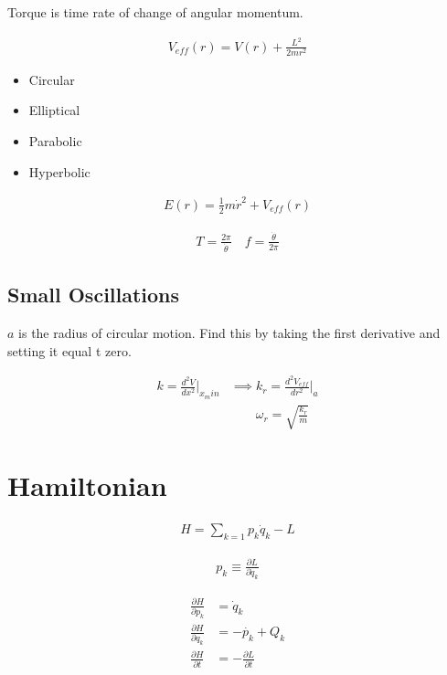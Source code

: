 \documentclass[10pt]{amsart}
\begin{document}
\begin{multicols}{2}
  Torque is time rate of change of angular momentum.

  \begin{align*}
    V_{eff}(r)=V(r)+\frac{L^2}{2mr^2}
  \end{align*}

  \begin{itemize}
    \item Circular
    \item Elliptical
    \item Parabolic
    \item Hyperbolic
  \end{itemize}

  \begin{align*}
    E(r)=\frac{1}{2}m\dot{r}^2+V_{eff}(r)
  \end{align*}

  \begin{align*}
    T=\frac{2\pi}{\dot{\theta}}\quad
    f=\frac{\dot{\theta}}{2\pi}
  \end{align*}

  \subsection{Small Oscillations}%
  \label{sub:small_oscillations}

  $a$ is the radius of circular motion. Find this by taking the first
  derivative and setting it equal t zero.

  \begin{align*}
    k=\frac{d^2V}{dx^2}\Bigr|_{x_min}&\implies
    k_r=\frac{d^2V_{eff}}{dr^2}\Bigr|_{a}\\
                                     &\qquad\omega_r=\sqrt{\frac{k_r}{m}}
  \end{align*}

  \section{Hamiltonian}%
  \label{sec:hamiltonian}
  
  \begin{align*}
    H=\sum_{k=1}p_k\dot{q}_k-L
  \end{align*}

  \begin{align*}
    p_k\equiv\frac{\partial L}{\partial \dot{q}_k}
  \end{align*}

  \begin{align*}
    \frac{\partial H}{\partial p_k}&=\dot{q}_k\\
    \frac{\partial H}{\partial q_k}&=-\dot{p_k}+Q_k\\
    \frac{\partial H}{\partial t}&=-\frac{\partial L}{\partial t}
  \end{align*}


\end{multicols}
\end{document}
